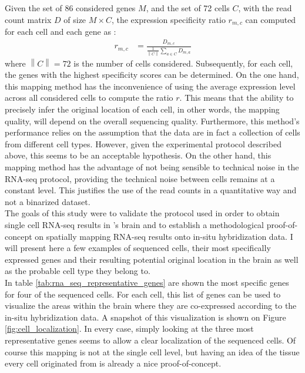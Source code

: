 	
	Given the set of 86 considered genes $M$, and the set of 72 cells $C$, with the read count matrix $D$ of size $M\times C$, the expression specificity ratio $r_{m,c}$ can computed for each cell and each gene as :
\begin{eqnarray*}
	r_{m,c} &= \frac{D_{m,c}}{\frac{1}{\left\|C\right\|}\sum_{a \in C}D_{m,a}}
\end{eqnarray*}
where $\left\|C\right\| = 72 $ is the number of cells considered. Subsequently, for each cell, the genes with the highest specificity scores can be determined. On the one hand, this mapping method has the inconvenience of using the average expression level across all considered cells to compute the ratio $r$. This means that the ability to precisely infer the original location of each cell, in other words, the mapping quality, will depend on the overall sequencing quality. Furthermore, this method's performance relies on the assumption that the data are in fact a collection of cells from different cell types. However, given the experimental protocol described above, this seems to be an acceptable hypothesis. On the other hand, this mapping method has the advantage of not being sensible to technical noise in the RNA-seq protocol, providing the technical noise between cells remains at a constant level. This justifies the use of the read counts in a quantitative way and not a binarized dataset.\\

	The goals of this study were to validate the protocol used in order to obtain single cell RNA-seq results in \platy{}'s brain and to establish a methodological proof-of-concept on spatially mapping RNA-seq results onto in-situ hybridization data. I will present here a few examples of sequenced cells, their most specifically expressed genes and their resulting potential original location in the brain as well as the probable cell type they belong to.\\
	
	In table \ref{tab:rna_seq_representative_genes} are shown the most specific genes for four of the sequenced cells. For each cell, this list of genes can be used to visualize the areas within the brain where they are co-expressed according to the in-situ hybridization data. A snapshot of this visualization is shown on Figure \ref{fig:cell_localization}. In every case, simply looking at the three most representative genes seems to allow a clear localization of the sequenced cells. Of course this mapping is not at the single cell level, but having an idea of the tissue every cell originated from is already a nice proof-of-concept.\\
	
